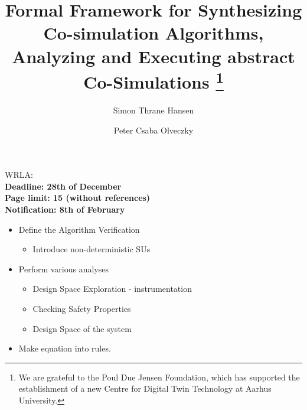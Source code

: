 \documentclass[runningheads]{llncs}
\begin{document}
\title{Formal Framework for Synthesizing Co-simulation Algorithms, Analyzing and Executing abstract Co-Simulations
\thanks{We are grateful to the Poul Due Jensen Foundation, which has supported the establishment of a new Centre for Digital Twin Technology at Aarhus University.}}

\author{Simon Thrane Hansen  
\and Peter Csaba Olveczky  }
%


%
\institute{
  DIGIT, Department of Electrical and Computer Engineering, Aarhus University, \\
  \and Department of Computer Science, Oslo University - \textbf{Check this} \\
}

\maketitle              %

WRLA:\\
\textbf{Deadline: 28th of December}
\\
\textbf{Page limit: 15 (without references)}\\
\textbf{Notification: 8th of February}


\begin{itemize}
  \item Define the Algorithm Verification
  \begin{itemize}
    \item Introduce non-deterministic SUs
  \end{itemize}
  \item Perform various analyses
  \begin{itemize}
    \item Design Space Exploration - instrumentation
    \item Checking Safety Properties
    \item Design Space of the system
  \end{itemize}
  \item Make equation into rules.
\end{itemize}
\end{document}
